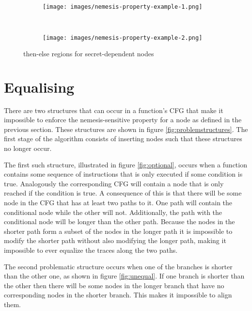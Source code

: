 \begin{figure*}[t!]
    \centering
    \begin{subfigure}[t]{0.5\textwidth}
        \centering
        \texttt{[image: images/nemesis-property-example-1.png]}
        \caption{}
        \label{fig:regionExampleA}
    \end{subfigure}%
    ~
    \begin{subfigure}[t]{0.5\textwidth}
        \centering
        \texttt{[image: images/nemesis-property-example-2.png]}
        \caption{}
        \label{fig:regionExampleB}
    \end{subfigure}
    \caption{then-else regions for secret-dependent nodes}
    \label{fig:regionExamples}
\end{figure*}

\section{Equalising}
\label{seq:equalising}
There are two structures that can occur in a function's CFG that make it impossible to enforce the nemesis-sensitive property for a node as defined in the previous section. 
These structures are shown in figure \ref{fig:problemstructures}.  
The first stage of the algorithm consists of inserting nodes such that these structures no longer occur. 

The first such structure, illustrated in figure \ref{fig:optional}, occurs when a function contains some sequence of instructions that is only executed if some condition is true.
Analogously the corresponding CFG will contain a node that is only reached if the condition is true.
A consequence of this is that there will be some node in the CFG that has at least two paths to it. 
One path will contain the conditional node while the other will not. 
Additionally, the path with the conditional node will be longer than the other path. 
Because the nodes in the shorter path form a subset of the nodes in the longer path it is impossible to modify the shorter path without also modifying the longer path, making it 
impossible to ever equalize the traces along the two paths.

The second problematic structure occurs when one of the branches is shorter than the other one, as shown in figure \ref	{fig:unequal}. 
If one branch is shorter than the other then there will be some nodes in the longer branch that have no corresponding  nodes in the shorter branch. 
This makes it impossible to align them. 

